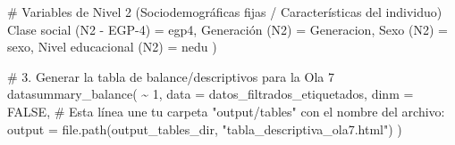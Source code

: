 \documentclass[
  spanish,
  a4paper,
  oneside]{scrbook}
\newenvironment{Shaded}{\begin{snugshade}}{\end{snugshade}}
\newcommand{\AttributeTok}[1]{\textcolor[rgb]{0.40,0.45,0.13}{#1}}
\newcommand{\CommentTok}[1]{\textcolor[rgb]{0.37,0.37,0.37}{#1}}
\newcommand{\ConstantTok}[1]{\textcolor[rgb]{0.56,0.35,0.01}{#1}}
\newcommand{\DecValTok}[1]{\textcolor[rgb]{0.68,0.00,0.00}{#1}}
\newcommand{\FunctionTok}[1]{\textcolor[rgb]{0.28,0.35,0.67}{#1}}
\newcommand{\NormalTok}[1]{\textcolor[rgb]{0.00,0.23,0.31}{#1}}
\newcommand{\OtherTok}[1]{\textcolor[rgb]{0.00,0.23,0.31}{#1}}
\newcommand{\SpecialCharTok}[1]{\textcolor[rgb]{0.37,0.37,0.37}{#1}}
\newcommand{\StringTok}[1]{\textcolor[rgb]{0.13,0.47,0.30}{#1}}
\begin{document}
\begin{Shaded}
\begin{Highlighting}[]
    \CommentTok{\# Variables de Nivel 2 (Sociodemográficas fijas / Características del individuo)}
    \StringTok{\textasciigrave{}}\AttributeTok{Clase social (N2 {-} EGP{-}4)}\StringTok{\textasciigrave{}}        \OtherTok{=}\NormalTok{ egp4,}
    \StringTok{\textasciigrave{}}\AttributeTok{Generación (N2)}\StringTok{\textasciigrave{}}                  \OtherTok{=}\NormalTok{ Generacion,}
    \StringTok{\textasciigrave{}}\AttributeTok{Sexo (N2)}\StringTok{\textasciigrave{}}                        \OtherTok{=}\NormalTok{ sexo,}
    \StringTok{\textasciigrave{}}\AttributeTok{Nivel educacional (N2)}\StringTok{\textasciigrave{}}           \OtherTok{=}\NormalTok{ nedu}
\NormalTok{  )}

\CommentTok{\# 3. Generar la tabla de balance/descriptivos para la Ola 7}
\FunctionTok{datasummary\_balance}\NormalTok{(}
  \SpecialCharTok{\textasciitilde{}} \DecValTok{1}\NormalTok{, }
  \AttributeTok{data =}\NormalTok{ datos\_filtrados\_etiquetados, }
  \AttributeTok{dinm =} \ConstantTok{FALSE}\NormalTok{,}
  \CommentTok{\# Esta línea une tu carpeta "output/tables" con el nombre del archivo:}
  \AttributeTok{output =} \FunctionTok{file.path}\NormalTok{(output\_tables\_dir, }\StringTok{"tabla\_descriptiva\_ola7.html"}\NormalTok{) }
\NormalTok{)}
\end{Highlighting}
\end{Shaded}
\end{document}
